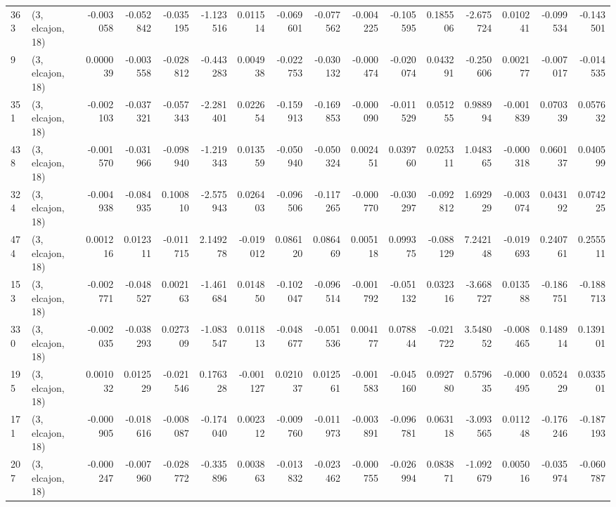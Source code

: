 \begin{tabular}{llrrrrrrrrrrrrrr}
363 &  (3, elcajon, 18) &  -0.003058 & -0.052842 & -0.035195 &   -1.123516 &  0.011514 &  -0.069601 & -0.077562 & -0.004225 & -0.105595 &  0.185506 &   -2.675724 &  0.010241 & -0.099534 & -0.143501 \\
9   &  (3, elcajon, 18) &   0.000039 & -0.003558 & -0.028812 &   -0.443283 &  0.004938 &  -0.022753 & -0.030132 & -0.000474 & -0.020074 &  0.043291 &   -0.250606 &  0.002177 & -0.007017 & -0.014535 \\
351 &  (3, elcajon, 18) &  -0.002103 & -0.037321 & -0.057343 &   -2.281401 &  0.022654 &  -0.159913 & -0.169853 & -0.000090 & -0.011529 &  0.051255 &    0.988994 & -0.001839 &  0.070339 &  0.057632 \\
438 &  (3, elcajon, 18) &  -0.001570 & -0.031966 & -0.098940 &   -1.219343 &  0.013559 &  -0.050940 & -0.050324 &  0.002451 &  0.039760 &  0.025311 &    1.048365 & -0.000318 &  0.060137 &  0.040599 \\
324 &  (3, elcajon, 18) &  -0.004938 & -0.084935 &  0.100810 &   -2.575943 &  0.026403 &  -0.096506 & -0.117265 & -0.000770 & -0.030297 & -0.092812 &    1.692929 & -0.003074 &  0.043192 &  0.074225 \\
474 &  (3, elcajon, 18) &   0.001216 &  0.012311 & -0.011715 &    2.149278 & -0.019012 &   0.086120 &  0.086469 &  0.005118 &  0.099375 & -0.088129 &    7.242148 & -0.019693 &  0.240761 &  0.255511 \\
153 &  (3, elcajon, 18) &  -0.002771 & -0.048527 &  0.002163 &   -1.461684 &  0.014850 &  -0.102047 & -0.096514 & -0.001792 & -0.051132 &  0.032316 &   -3.668727 &  0.013588 & -0.186751 & -0.188713 \\
330 &  (3, elcajon, 18) &  -0.002035 & -0.038293 &  0.027309 &   -1.083547 &  0.011813 &  -0.048677 & -0.051536 &  0.004177 &  0.078844 & -0.021722 &    3.548052 & -0.008465 &  0.148914 &  0.139101 \\
195 &  (3, elcajon, 18) &   0.001032 &  0.012529 & -0.021546 &    0.176328 & -0.001127 &   0.021037 &  0.012561 & -0.001583 & -0.045160 &  0.092780 &    0.579635 & -0.000495 &  0.052429 &  0.033501 \\
171 &  (3, elcajon, 18) &  -0.000905 & -0.018616 & -0.008087 &   -0.174040 &  0.002312 &  -0.009760 & -0.011973 & -0.003891 & -0.096781 &  0.063118 &   -3.093565 &  0.011248 & -0.176246 & -0.187193 \\
207 &  (3, elcajon, 18) &  -0.000247 & -0.007960 & -0.028772 &   -0.335896 &  0.003863 &  -0.013832 & -0.023462 & -0.000755 & -0.026994 &  0.083871 &   -1.092679 &  0.005016 & -0.035974 & -0.060787 \\

\end{tabular}
